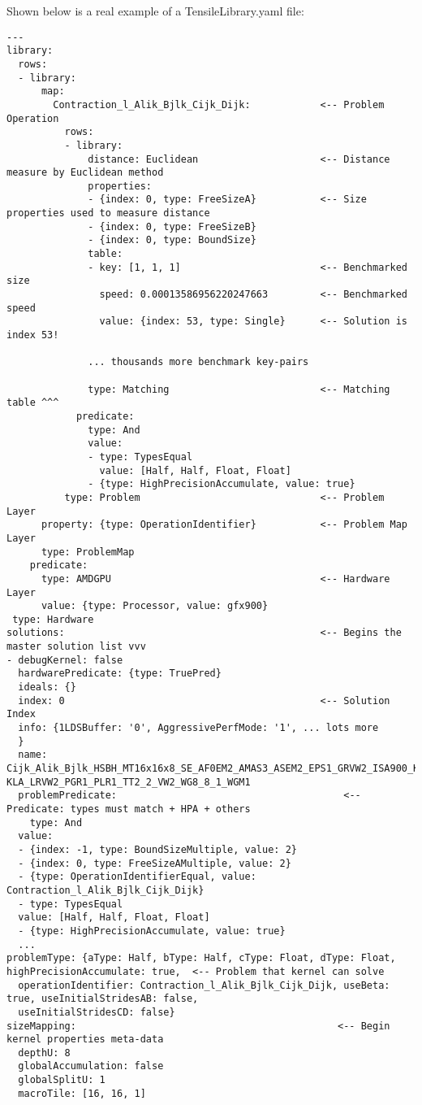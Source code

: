 \documentclass[]{article}
\begin{document}
Shown below is a real example of a TensileLibrary.yaml file:


\begin{verbatim}
---
library:
  rows:
  - library:
      map:
        Contraction_l_Alik_Bjlk_Cijk_Dijk:            <-- Problem Operation
          rows:
          - library:
              distance: Euclidean                     <-- Distance measure by Euclidean method
              properties:
              - {index: 0, type: FreeSizeA}           <-- Size properties used to measure distance
              - {index: 0, type: FreeSizeB}
              - {index: 0, type: BoundSize}
              table:
              - key: [1, 1, 1]                        <-- Benchmarked size
                speed: 0.00013586956220247663         <-- Benchmarked speed
                value: {index: 53, type: Single}      <-- Solution is index 53!

              ... thousands more benchmark key-pairs

              type: Matching                          <-- Matching table ^^^
            predicate:
              type: And
              value:
              - type: TypesEqual
                value: [Half, Half, Float, Float]
              - {type: HighPrecisionAccumulate, value: true}
          type: Problem                               <-- Problem Layer
      property: {type: OperationIdentifier}           <-- Problem Map Layer
      type: ProblemMap
    predicate:
      type: AMDGPU                                    <-- Hardware Layer
      value: {type: Processor, value: gfx900}
 type: Hardware
solutions:                                            <-- Begins the master solution list vvv
- debugKernel: false
  hardwarePredicate: {type: TruePred}
  ideals: {}
  index: 0                                            <-- Solution Index
  info: {1LDSBuffer: '0', AggressivePerfMode: '1', ... lots more
  }
  name: Cijk_Alik_Bjlk_HSBH_MT16x16x8_SE_AF0EM2_AMAS3_ASEM2_EPS1_GRVW2_ISA900_K1_ KLA_LRVW2_PGR1_PLR1_TT2_2_VW2_WG8_8_1_WGM1
  problemPredicate:                                       <-- Predicate: types must match + HPA + others
    type: And
  value:
  - {index: -1, type: BoundSizeMultiple, value: 2}
  - {index: 0, type: FreeSizeAMultiple, value: 2}
  - {type: OperationIdentifierEqual, value: Contraction_l_Alik_Bjlk_Cijk_Dijk}
  - type: TypesEqual
  value: [Half, Half, Float, Float]
  - {type: HighPrecisionAccumulate, value: true}
  ...
problemType: {aType: Half, bType: Half, cType: Float, dType: Float, highPrecisionAccumulate: true,  <-- Problem that kernel can solve
  operationIdentifier: Contraction_l_Alik_Bjlk_Cijk_Dijk, useBeta: true, useInitialStridesAB: false,
  useInitialStridesCD: false}
sizeMapping:                                             <-- Begin kernel properties meta-data
  depthU: 8
  globalAccumulation: false
  globalSplitU: 1
  macroTile: [16, 16, 1]


\end{verbatim}
\end{document}
